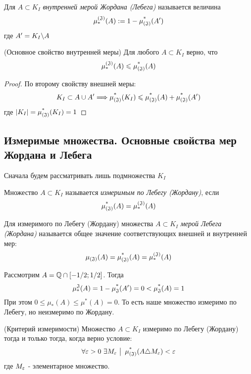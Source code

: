 \begin{definition}
	Для $A \subset K_I$ \textit{внутренней мерой Жордана (Лебега)} называется величина
	\[
		\operatorname{\mu^{(\mathfrak{J})}_*}(A) := 1 - \operatorname{\mu^*_{(\mathfrak{J})}}(A')
	\]
	где $A' = K_I \backslash A$
\end{definition}

\begin{theorem} (Основное свойство внутренней меры)
	Для любого $A \subset K_I$ верно, что
	\[
		\operatorname{\mu^{(\mathfrak{J})}_*}(A) \leqslant \operatorname{\mu^*_{(\mathfrak{J})}}(A)
	\]
\end{theorem}

\begin{proof}
	По второму свойству внешней меры:
	\[
		K_I \subset A \cup A' \Longrightarrow \operatorname{\mu^*_{(\mathfrak{J})}}(K_I) \leqslant \operatorname{\mu^*_{(\mathfrak{J})}}(A) + \operatorname{\mu^*_{(\mathfrak{J})}}(A')
	\]
	где $|K_I| = \operatorname{\mu^*_{(\mathfrak{J})}}(K_I) = 1$
\end{proof}

\subsection{Измеримые множества. Основные свойства мер Жордана и Лебега}

\begin{note}
	Сначала будем рассматривать лишь подмножества $K_I$
\end{note}

\begin{definition}
	Множество $A \subset K_I$ называется \textit{измеримым по Лебегу (Жордану)}, если
	\[
		\operatorname{\mu^*_{(\mathfrak{J})}}(A) = \operatorname{\mu^{(\mathfrak{J})}_*}(A)
	\]
\end{definition}

\begin{definition}
	Для измеримого по Лебегу (Жордану) множества $A \subset K_I$ \textit{мерой Лебега (Жордана)} называется общее значение соответствующих внешней и внутренней мер:
	\[
		\operatorname{\mu_{(\mathfrak{J})}}(A) = \operatorname{\mu^*_{(\mathfrak{J})}}(A) = \operatorname{\mu^{(\mathfrak{J})}_*}(A)
	\]
\end{definition}

\begin{example}
	Рассмотрим $A = \mathbb{Q} \cap [-1/2; 1/2]$. Тогда
	\[
		\operatorname{\mu^\mathfrak{J}_*}(A) = 1 - \operatorname{\mu^*_\mathfrak{J}}(A') = 0 < \operatorname{\mu^*_\mathfrak{J}}(A) = 1
	\]
	При этом $0 \le \mu_*(A) \le \mu^*(A) = 0$. То есть наше множество измеримо по Лебегу, но неизмеримо по Жордану.
\end{example}

\begin{theorem} (Критерий измеримости)
	Множество $A \subset K_I$ измеримо по Лебегу (Жордану) тогда и только тогда, когда верно условие:
	\[
		\forall \varepsilon > 0\ \exists M_\varepsilon \ \big|\  \operatorname{\mu^*_{(\mathfrak{J})}}(A \triangle M_\varepsilon) < \varepsilon
	\]
	где $M_\varepsilon$ - элементарное множество.
\end{theorem}

